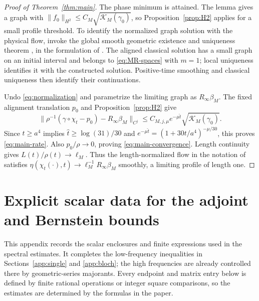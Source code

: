 \documentclass[a4paper,11pt]{article}
\numberwithin{equation}{section}
\theoremstyle{definition}
\theoremstyle{remark}
\newcommand{\norm}[1]{\lVert#1\rVert}
\newcommand{\KM}{\mathcal K_M}
\begin{document}
\begin{proof}[Proof of Theorem~\ref{thm:main}]
The phase minimum is attained. The lemma gives a graph with $\norm{f_0}_{H^2}\le C_M\sqrt{\KM(\gamma_0)}$, so Proposition~\ref{prop:H2} applies for a small profile threshold. To identify the normalized graph solution with the physical flow, invoke the global smooth geometric existence and uniqueness theorem \cite[Theorem~3.2]{DKS}, in the formulation of \cite[Theorem~1.1]{MW}. The aligned classical solution has a small graph on an initial interval and belongs to \eqref{eq:MR-spaces} with $m=1$; local uniqueness identifies it with the constructed solution. Positive-time smoothing and classical uniqueness then identify their continuations.

Undo \eqref{eq:normalization} and parametrize the limiting graph as $R_\infty\beta_M$. The fixed alignment translation $p_0$ and Proposition~\ref{prop:H2} give
\[
 \norm{\rho^{-1}(\gamma\circ\chi_t-p_0)-R_\infty\beta_M}_{C^j}
 \le C_{M,j,\mu}e^{-\mu\widehat t}\sqrt{\KM(\gamma_0)}.
\]
Since $t\ge a^4$ implies $\widehat t\ge\log(31)/30$ and $e^{-\mu\widehat t}=(1+30t/a^4)^{-\mu/30}$, this proves \eqref{eq:main-rate}. Also $p_0/\rho\to0$, proving \eqref{eq:main-convergence}. Length continuity gives $L(t)/\rho(t)\to\ell_M$. Thus the length-normalized flow in the notation of \cite[Theorem~1.2]{MW} satisfies $\eta(\chi_t(\cdot),t)\to\ell_M^{-1}R_\infty\beta_M$ smoothly, a limiting profile of length one.
\end{proof}

\appendix

\section{Explicit scalar data for the adjoint and Bernstein bounds}\label{app:arithmetic}
This appendix records the scalar enclosures and finite expressions used in the spectral estimates. It completes the low-frequency inequalities in Sections~\ref{app:single} and \ref{app:bloch}; the high frequencies are already controlled there by geometric-series majorants. Every endpoint and matrix entry below is defined by finite rational operations or integer square comparisons, so the estimates are determined by the formulas in the paper.
\end{document}
